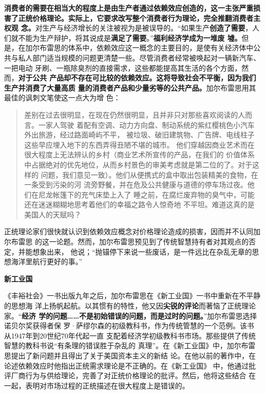 \textbf{消费者的需要在相当大的程度上是由生产者通过依赖效应创造的，这一主张严重损
  害了正统价格理论。实际上，它要求改写整个消费者行为理论，完全推翻消费者主权观
  念。}对生产与经济增长的关注被视为是被误导的。“如果生产\textbf{创造了需要}，人
们就不能为生产辩护，将其说成是\textbf{满足了需要}。”\textbf{福利经济学成为一堆废
  墟。}但是，在加尔布雷思的体系中，依赖效应这一概念的主要目的，是使有关经济体中公
共与私人部门适当规模的问题更清楚一些。尽管消费者经常被唤起对一辆新汽车、一把电动
牙刷、一瓶除臭剂的直接需求，这些都能提高其生活的各个方面，然而，\textbf{对于公共
  产品却不存在可比较的依赖效应。这将导致社会不平衡，因为我们生产并消费了大量高质
  量的消费者产品和少量劣等的公共产品。}加尔布雷思用其最佳的讽刺文笔使这一点大为增
色：

\begin{quotation}
  差别在过去很明显，在现在仍然很明显，且并非只对那些喜欢阅读的人而言。一家人驾驶
  着配有空调、动力方向盘、制动系统的紫红樱桃色小汽车外出旅游，经过路面崎屿不平，
  被垃圾、破旧建筑物、广告牌、电线柱子这些早应埋入地下的东西弄得丑陋不堪的城市。
  他们穿越因商业艺术而在很大程度上无法辨认的乡村（商业艺术所宣传的产品，在我们的
  价值体系中占据绝对的优先地位，从而乡村景色的审美考虑就是第二位的了。对于这样的
  问题，我们意见一致）。他们从便携式的盒中取出包装精美的食物，在一条受到污染的河
  流旁野餐，并在危及公共健康与道德的停车场过夜。他们在尼龙帐篷下的充气床垫上入了
  睡之前，在腐烂废弃物的臭气中，可能还在迷迷糊糊地思考着他们的幸福之路令人惊奇地
  不平坦。难道这真的是美国人的天赋吗？
\end{quotation}

正统理论家们很快就认识到依赖效应概念对价格理论造成的损害，因而并不认同加尔布雷思
的这一论题。然而，加尔布雷思预见到了传统智慧持有者对其观点的否定，并能想象出来，
他说；“抛锚停下来说一些废话，是一件远比在杂乱无章的思想海洋里航行更好的事。”

\textbf{\sffamily 新工业国}

《丰裕社会》一书出版九年之后，加尔布雷思在《新工业国》一书中重新在不平静的思想海
洋上扬帆起航。以其惯有的特性，他又因\textbf{尖锐的评论}而著恼了正统理论家。“\textbf{经济
学的问题……不是初始错误的问题，而是过时的问题。}”加尔布雷思选择诺贝尔奖获得者保
罗·萨缪尔森的初级教科书，作为传统管慧的一个范例。该书从1947年到20世纪70年代起一直
支配着经济学初级教科书市场。那些提供了传统智慧的教科书说“有条理的错误胜于杂乱的
真理”。在《新工业国》中，加尔布雷思提出了新问题并且得出了关于美国资本主义的新结
论。在他以前的著作中，在论述依赖效应时他指出正统需求理论是不正确的。在《新工业国》
中，他通过批评厂商行为与供给理论，完善了对正统价格理论的批评。然后，他将这些结合
在一起，表明对市场过程的正统描述在很大程度上是错误的。

